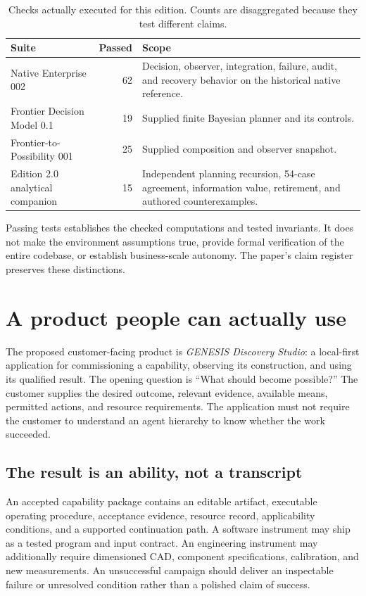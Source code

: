 \documentclass[11pt,letterpaper]{article}
\theoremstyle{remark}\newtheorem{remark}{Remark}[section]
\begin{document}
\begin{table}[H]
\caption{Checks actually executed for this edition. Counts are disaggregated because they test different claims.}\label{tab:tests}
\begin{tabularx}{\linewidth}{Y r Y}
\toprule
\textbf{Suite}&\textbf{Passed}&\textbf{Scope}\\
\midrule
Native Enterprise 002 & 62 & Decision, observer, integration, failure, audit, and recovery behavior on the historical native reference.\\
Frontier Decision Model 0.1 & 19 & Supplied finite Bayesian planner and its controls.\\
Frontier-to-Possibility 001 & 25 & Supplied composition and observer snapshot.\\
Edition 2.0 analytical companion & 15 & Independent planning recursion, 54-case agreement, information value, retirement, and authored counterexamples.\\
\bottomrule
\end{tabularx}
\end{table}

Passing tests establishes the checked computations and tested invariants. It does not make the environment assumptions true, provide formal verification of the entire codebase, or establish business-scale autonomy. The paper's claim register preserves these distinctions.

\section{A product people can actually use}\label{sec:product}
The proposed customer-facing product is \emph{GENESIS Discovery Studio}: a local-first application for commissioning a capability, observing its construction, and using its qualified result. The opening question is ``What should become possible?'' The customer supplies the desired outcome, relevant evidence, available means, permitted actions, and resource requirements. The application must not require the customer to understand an agent hierarchy to know whether the work succeeded.

\subsection{The result is an ability, not a transcript}
An accepted capability package contains an editable artifact, executable operating procedure, acceptance evidence, resource record, applicability conditions, and a supported continuation path. A software instrument may ship as a tested program and input contract. An engineering instrument may additionally require dimensioned CAD, component specifications, calibration, and new measurements. An unsuccessful campaign should deliver an inspectable failure or unresolved condition rather than a polished claim of success.
\end{document}
